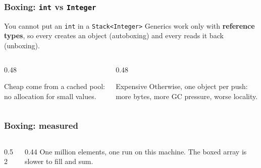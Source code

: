 \documentclass[aspectratio=169,10pt,compress]{beamer}
\begin{document}
\begin{frame}[t,fragile] \frametitle{Boxing: \texttt{int} vs \texttt{Integer}}
  \begin{block}{You cannot put an \texttt{int} in a \texttt{Stack<Integer>}}
    \small
    Generics work only with \textbf{reference types}, so every
     creates an  object (autoboxing)
    and every  reads it back (unboxing).
  \end{block}
  \begin{columns}[T]
    \begin{column}{0.48\textwidth}
      \begin{block}{Cheap}
        \small {} come from a cached pool:
        no allocation for small values.
      \end{block}
    \end{column}
    \begin{column}{0.48\textwidth}
      \begin{block}{Expensive}
        \small Otherwise, one  object per push: more bytes,
        more GC pressure, worse locality.
      \end{block}
    \end{column}
  \end{columns}
\end{frame}




\begin{frame}[t,fragile] \frametitle{Boxing: measured}
  \begin{columns}[T]
    \begin{column}{0.52\textwidth}
    \end{column}
    \begin{column}{0.44\textwidth}
      \small
      One million elements, one run on this machine.
      The boxed array is  slower to fill and sum.
    \end{column}
  \end{columns}
\end{frame}
\end{document}
